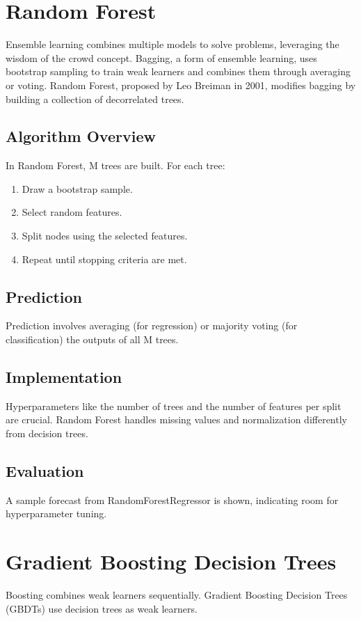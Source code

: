 \documentclass{article}
\begin{document}
\section{Random Forest}
Ensemble learning combines multiple models to solve problems, leveraging the wisdom of the crowd concept. Bagging, a form of ensemble learning, uses bootstrap sampling to train weak learners and combines them through averaging or voting. Random Forest, proposed by Leo Breiman in 2001, modifies bagging by building a collection of decorrelated trees.

\subsection{Algorithm Overview}
In Random Forest, M trees are built. For each tree:
\begin{enumerate}
    \item Draw a bootstrap sample.
    \item Select random features.
    \item Split nodes using the selected features.
    \item Repeat until stopping criteria are met.
\end{enumerate}

\subsection{Prediction}
Prediction involves averaging (for regression) or majority voting (for classification) the outputs of all M trees.

\subsection{Implementation}
Hyperparameters like the number of trees and the number of features per split are crucial. Random Forest handles missing values and normalization differently from decision trees.

\subsection{Evaluation}
A sample forecast from RandomForestRegressor is shown, indicating room for hyperparameter tuning.

\section{Gradient Boosting Decision Trees}
Boosting combines weak learners sequentially. Gradient Boosting Decision Trees (GBDTs) use decision trees as weak learners.
\end{document}
